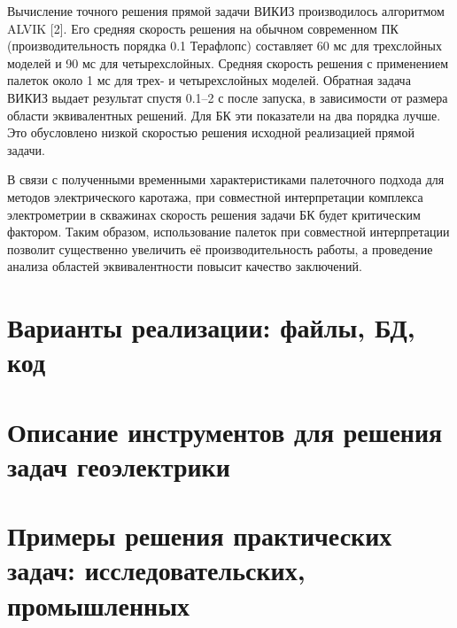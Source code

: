 Вычисление точного решения прямой задачи ВИКИЗ производилось алгоритмом
ALVIK [2]. Его средняя скорость решения на обычном современном ПК
(производительность порядка 0.1 Терафлопс) составляет 60 мс для трехслойных
моделей и 90 мс для четырехслойных. Средняя скорость решения с применением
палеток около 1 мс для трех- и четырехслойных моделей. Обратная задача
ВИКИЗ выдает результат спустя 0.1--2 с после запуска, в зависимости от
размера области эквивалентных решений. Для БК эти показатели на два порядка
лучше. Это обусловлено низкой скоростью решения исходной реализацией прямой
задачи.

В связи с полученными временными характеристиками палеточного подхода для
методов электрического каротажа, при совместной интерпретации комплекса
электрометрии в скважинах скорость решения задачи БК будет критическим
фактором. Таким образом, использование палеток при совместной интерпретации
позволит существенно увеличить её производительность работы, а проведение
анализа областей эквивалентности повысит качество заключений.


\section{Варианты реализации: файлы, БД, код} \label{sect3_1}


\section{Описание инструментов для решения задач геоэлектрики} \label{sect3_2}

\section{Примеры решения практических задач: исследовательских, промышленных} \label{sect3_3}


\clearpage